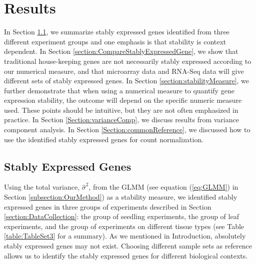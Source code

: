 \documentclass[letterpaper,12pt]{article}
\begin{document}


\section{Results} \label{section:Results}
In Section \ref{section:stablyExpressedGene}, we summarize stably expressed genes identified from three
different experiment groups and one emphasis is that stability is
context dependent. In Section \ref{section:CompareStablyExpressedGene}, we show that traditional house-keeping
genes are not necessarily stably expressed according to our numerical measure, 
and that microarray data and RNA-Seq data will give different sets of stably
expressed genes.  In Section \ref{section:stabilityMeasure}, we further demonstrate that when using a
numerical measure to quantify gene expression stability, the outcome will
depend on the specific numeric measure used.  These points should be
intuitive, but they are not often emphasized in practice.  In Section
\ref{Section:varianceComp}, we discuss results from variance component analysis. In Section
\ref{Section:commonReference}, we discussed how to use the identified stably
expressed genes for count normalization.

\subsection{Stably Expressed Genes}\label{section:stablyExpressedGene}
Using the total variance, $\hat\sigma^2$, from the GLMM (see
equation (\ref{eq:GLMM}) in Section \ref{subsection:OurMethod}) as a
stability measure, we identified stably expressed genes in three groups of
experiments described in Section \ref{section:DataCollection}: the group of seedling
experiments, the group of leaf experiments, and the group of experiments on
different tissue types (see Table \ref{table:TableSet3} for a summary).
As we mentioned in Introduction, absolutely stably expressed genes may not
exist.  Choosing different sample sets as reference allows us to identify the
stably expressed genes for different biological contexts.
\end{document}
